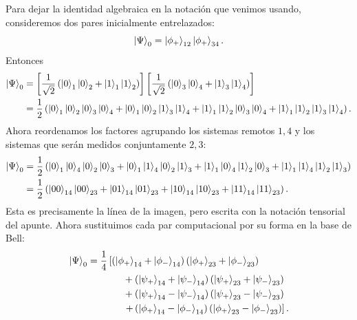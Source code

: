 \documentclass[12pt,a4paper]{article}
\theoremstyle{definition}
\theoremstyle{plain}
\theoremstyle{remark}
\begin{document}
Para dejar la identidad algebraica en la notación que venimos usando, consideremos dos pares inicialmente entrelazados:
\begin{equation*}
    \ket{\Psi}_0=\ket{\phi_+}_{12}\ket{\phi_+}_{34}.
\end{equation*}
Entonces
\begin{align*}
    \ket{\Psi}_0
    &=
    \left[
        \frac{1}{\sqrt{2}}
        \left(
            \ket{0}_1\ket{0}_2+
            \ket{1}_1\ket{1}_2
        \right)
    \right]
    \left[
        \frac{1}{\sqrt{2}}
        \left(
            \ket{0}_3\ket{0}_4+
            \ket{1}_3\ket{1}_4
        \right)
    \right]\\
    &=
    \frac{1}{2}
    \left(
        \ket{0}_1\ket{0}_2\ket{0}_3\ket{0}_4
        +
        \ket{0}_1\ket{0}_2\ket{1}_3\ket{1}_4
        +
        \ket{1}_1\ket{1}_2\ket{0}_3\ket{0}_4
        +
        \ket{1}_1\ket{1}_2\ket{1}_3\ket{1}_4
    \right).
\end{align*}
Ahora reordenamos los factores agrupando los sistemas remotos $1,4$ y los sistemas que serán medidos conjuntamente $2,3$:
\begin{align*}
    \ket{\Psi}_0
    &=
    \frac{1}{2}
    \left(
        \ket{0}_1\ket{0}_4\ket{0}_2\ket{0}_3
        +
        \ket{0}_1\ket{1}_4\ket{0}_2\ket{1}_3
        +
        \ket{1}_1\ket{0}_4\ket{1}_2\ket{0}_3
        +
        \ket{1}_1\ket{1}_4\ket{1}_2\ket{1}_3
    \right)\\
    &=
    \frac{1}{2}
    \left(
        \ket{00}_{14}\ket{00}_{23}
        +
        \ket{01}_{14}\ket{01}_{23}
        +
        \ket{10}_{14}\ket{10}_{23}
        +
        \ket{11}_{14}\ket{11}_{23}
    \right).
\end{align*}
Esta es precisamente la línea de la imagen, pero escrita con la notación tensorial del apunte. Ahora sustituimos cada par computacional por su forma en la base de Bell:
\begin{align*}
    \ket{\Psi}_0
    &=
    \frac{1}{4}
    \left[
        \left(
            \ket{\phi_+}_{14}+\ket{\phi_-}_{14}
        \right)
        \left(
            \ket{\phi_+}_{23}+\ket{\phi_-}_{23}
        \right)
    \right.\\
    &\hspace{1.3cm}
        +
        \left(
            \ket{\psi_+}_{14}+\ket{\psi_-}_{14}
        \right)
        \left(
            \ket{\psi_+}_{23}+\ket{\psi_-}_{23}
        \right)\\
    &\hspace{1.3cm}
        +
        \left(
            \ket{\psi_+}_{14}-\ket{\psi_-}_{14}
        \right)
        \left(
            \ket{\psi_+}_{23}-\ket{\psi_-}_{23}
        \right)\\
    &\hspace{1.3cm}
    \left.
        +
        \left(
            \ket{\phi_+}_{14}-\ket{\phi_-}_{14}
        \right)
        \left(
            \ket{\phi_+}_{23}-\ket{\phi_-}_{23}
        \right)
    \right].
\end{align*}
\end{document}
